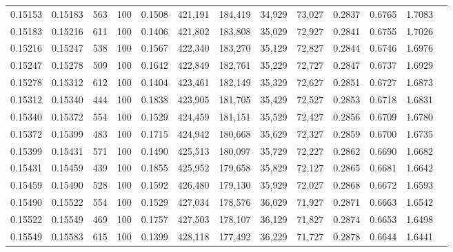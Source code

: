\begin{tabular}{rrrrrrrrrrrrr}
0.15153 & 0.15183 &   563 & 100 &                                     0.1508 & 421,191 & 184,419 &  34,929 &  73,027 & 0.2837 & 0.6765 & 1.7083 \\
0.15183 & 0.15216 &   611 & 100 &                                     0.1406 & 421,802 & 183,808 &  35,029 &  72,927 & 0.2841 & 0.6755 & 1.7026 \\
0.15216 & 0.15247 &   538 & 100 &                                     0.1567 & 422,340 & 183,270 &  35,129 &  72,827 & 0.2844 & 0.6746 & 1.6976 \\
0.15247 & 0.15278 &   509 & 100 &                                     0.1642 & 422,849 & 182,761 &  35,229 &  72,727 & 0.2847 & 0.6737 & 1.6929 \\
0.15278 & 0.15312 &   612 & 100 &                                     0.1404 & 423,461 & 182,149 &  35,329 &  72,627 & 0.2851 & 0.6727 & 1.6873 \\
0.15312 & 0.15340 &   444 & 100 &                                     0.1838 & 423,905 & 181,705 &  35,429 &  72,527 & 0.2853 & 0.6718 & 1.6831 \\
0.15340 & 0.15372 &   554 & 100 &                                     0.1529 & 424,459 & 181,151 &  35,529 &  72,427 & 0.2856 & 0.6709 & 1.6780 \\
0.15372 & 0.15399 &   483 & 100 &                                     0.1715 & 424,942 & 180,668 &  35,629 &  72,327 & 0.2859 & 0.6700 & 1.6735 \\
0.15399 & 0.15431 &   571 & 100 &                                     0.1490 & 425,513 & 180,097 &  35,729 &  72,227 & 0.2862 & 0.6690 & 1.6682 \\
0.15431 & 0.15459 &   439 & 100 &                                     0.1855 & 425,952 & 179,658 &  35,829 &  72,127 & 0.2865 & 0.6681 & 1.6642 \\
0.15459 & 0.15490 &   528 & 100 &                                     0.1592 & 426,480 & 179,130 &  35,929 &  72,027 & 0.2868 & 0.6672 & 1.6593 \\
0.15490 & 0.15522 &   554 & 100 &                                     0.1529 & 427,034 & 178,576 &  36,029 &  71,927 & 0.2871 & 0.6663 & 1.6542 \\
0.15522 & 0.15549 &   469 & 100 &                                     0.1757 & 427,503 & 178,107 &  36,129 &  71,827 & 0.2874 & 0.6653 & 1.6498 \\
0.15549 & 0.15583 &   615 & 100 &                                     0.1399 & 428,118 & 177,492 &  36,229 &  71,727 & 0.2878 & 0.6644 & 1.6441 \\

\end{tabular}
